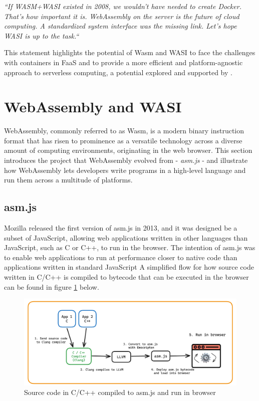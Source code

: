 \documentclass[
  table]{report}
\begin{document}
\begin{displayquote}
\textit{ ``If WASM+WASI existed in 2008, we wouldn't have needed to create Docker.
That's how important it is. WebAssembly on the server is the future of cloud
computing. A standardized system interface was the missing link. Let's hope WASI
is up to the task.`` \citep{hykesOne2019} }
\end{displayquote}

This statement highlights the potential of \ac{Wasm} and \ac{WASI} to
face the challenges with containers in FaaS and to provide a more
efficient and platform-agnostic approach to serverless computing, a
potential explored and supported by
\citet{kjorveziroskiEvaluatingWebAssemblyOrchestrated2022}.

\section{WebAssembly and WASI}
\label{sect:wasmwasi}

WebAssembly, commonly referred to as Wasm, is a modern binary
instruction format that has risen to prominence as a versatile
technology across a diverse amount of computing environments,
originating in the web browser. This section introduces the project that
WebAssembly evolved from - \emph{asm.js} - and illustrate how
WebAssembly lets developers write programs in a high-level language and
run them across a multitude of platforms.

\subsection{asm.js}
\label{subsect:asm}

Mozilla released the first version of asm.js in 2013, and it was
designed be a subset of JavaScript, allowing web applications written in
other languages than JavaScript, such as C or C++, to run in the
browser. The intention of asm.js was to enable web applications to run
at performance closer to native code than applications written in
standard JavaScript A simplified flow for how source code written in
C/C++ is compiled to bytecode that can be executed in the browser can be
found in figure \ref{fig:asm-figure} below.

\begin{figure}[H]
\centering
  \includegraphics{assets/asm.js-figure.png}
\caption{Source code in C/C++ compiled to asm.js and run in browser}\label{fig:asm-figure}
\end{figure}
\end{document}
